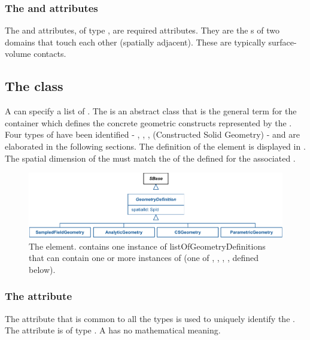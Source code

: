 \subsubsection{The  and  attributes}
The  and  attributes, of type , are required attributes. They are the s of two domains that touch each other (spatially adjacent).  These are typically surface-volume contacts.


\subsection{The  class}
\label{GeometryDefinition-class}
A \Geometry can specify a list of \GeometryDefinitions. The \GeometryDefinition is an abstract class that is the general term for the container which defines the concrete geometric constructs represented by the \Geometry. Four types of \GeometryDefinitions have been identified - \AnalyticGeometry, \SampledFieldGeometry, \ParametricGeometry, \CSGeometry (Constructed Solid Geometry) - and are elaborated in the following sections. The definition of the \GeometryDefinition element is displayed in .  The spatial dimension of the \GeometryDefinition must match the  of the \DomainType defined for the associated \Domain.

\begin{figure}[ht]
  \includegraphics{figs/GeometryDefinition-uml}
  \caption{The \GeometryDefinition element. \Geometry contains one instance of listOfGeometryDefinitions that can contain one or more instances of \GeometryDefinition (one of \AnalyticGeometry, \SampledFieldGeometry, \CSGeometry, \ParametricGeometry, defined below).}
  \label{GeometryDefinition-uml}
\end{figure}

\subsubsection{The  attribute}
The  attribute that is common to all the \GeometryDefinition types is used to uniquely identify the \GeometryDefinition. The attribute is of type .  A \GeometryDefinition has no mathematical meaning.


